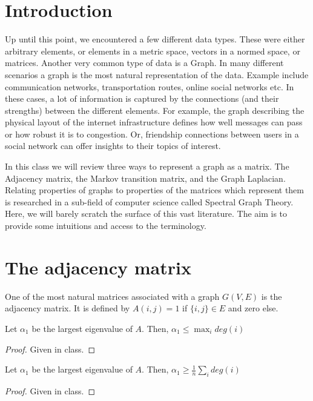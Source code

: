 \documentclass{article}
\begin{document}

\section{Introduction}
Up until this point, we encountered a few different data types.
These were either arbitrary elements, or elements in a metric space, vectors in a normed space, or matrices.
Another very common type of data is a Graph.
In many different scenarios a graph is the most natural representation of the data.
Example include communication networks, transportation routes, online social networks etc.
In these cases, a lot of information is captured by the connections (and their strengths) between the different elements.
For example, the graph describing the physical layout of the internet infrastructure defines how well messages can pass
or how robust it is to congestion. 
Or, friendship connections between users in a social network can offer insights to their topics of interest.

In this class we will review three ways to represent a graph as a matrix.
The Adjacency matrix, the Markov transition matrix, and the Graph Laplacian.
Relating properties of graphs to properties of the matrices which represent them is 
researched in a sub-field of computer science called Spectral Graph Theory.
Here, we will barely scratch the surface of this vast literature.
The aim is to provide some intuitions and access to the terminology.

\section{The adjacency matrix}
One of the most natural matrices associated with a graph $G(V,E)$ is the adjacency matrix.
It is defined by $A(i,j) = 1$ if $\{i,j\} \in E$ and zero else.

\begin{fact}
Let $\alpha_1$ be the largest eigenvalue of $A$. Then, $\alpha_1 \le \max_i deg(i)$ 
\end{fact}
\begin{proof}
Given in class.
\end{proof}

\begin{fact}
Let $\alpha_1$ be the largest eigenvalue of $A$. Then, $\alpha_1 \ge \frac{1}{n} \sum_{i}deg(i)$ 
\end{fact}
\begin{proof}
Given in class.
\end{proof}
\end{document}
